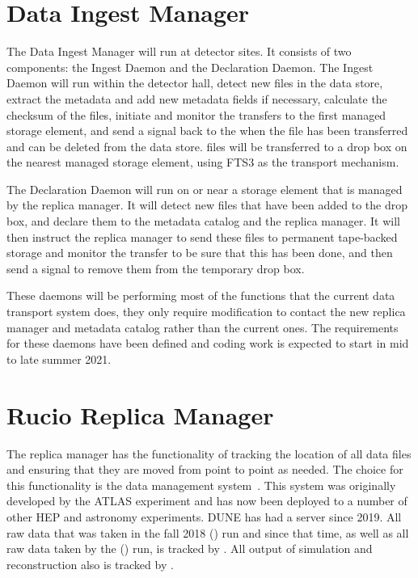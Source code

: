 \documentclass[../main-v1.tex]{subfiles}
\begin{document}
\section{Data Ingest Manager }

The Data Ingest Manager will run at detector sites.  It consists of two components:  the Ingest Daemon and the Declaration Daemon.  The Ingest Daemon will 
run within the detector hall,
detect new files in the data store, extract the metadata and add new metadata fields
if necessary, calculate the checksum of the files, initiate and monitor the transfers to the first managed 
storage element, and send a signal back to the  when the file has been transferred and can be deleted from the data store.
files will be transferred to a drop box on the nearest managed storage element, using FTS3  as the transport mechanism.  

The Declaration Daemon will run on or near a storage element that is managed by the replica manager. 
It will detect new files that have been added to the drop box, and declare them to the metadata catalog and the replica manager.  It will then instruct the replica manager to send these files to permanent tape-backed storage and monitor the transfer to be sure that this has been done, and then send a signal to remove them from the temporary drop box.

These daemons will be performing most of the functions that the current data transport system does, they only 
require modification to contact the new replica manager and metadata catalog rather than the current ones.  The 
requirements for these daemons have been defined   and %
coding work is expected to start in mid to late summer 2021. 

\section{Rucio Replica Manager }

The replica manager has the functionality of tracking the location of all data files %
and ensuring that they 
are moved from point to point as needed.  The choice %
for this functionality is the  data
management system~\cite{Baritsis:2019csbs}.  This system was originally developed by the ATLAS experiment and has now been deployed to 
a number of other HEP and astronomy experiments.  DUNE has had a  server since 2019.  All raw data that was
taken in the fall 2018  () run and since that time, as well as all raw data taken by the  () run, is tracked by .  All output of  simulation and reconstruction also is tracked by . 
\end{document}
